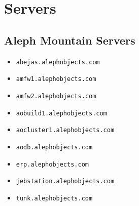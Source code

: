 %
%
%
%
%

\section{Servers}

\subsection{Aleph Mountain Servers}
\begin{itemize}
\item \texttt{abejas.alephobjects.com}
\item \texttt{amfw1.alephobjects.com}
\item \texttt{amfw2.alephobjects.com}
\item \texttt{aobuild1.alephobjects.com}
\item \texttt{aocluster1.alephobjects.com}
\item \texttt{aodb.alephobjects.com}
\item \texttt{erp.alephobjects.com}
\item \texttt{jebstation.alephobjects.com}
\item \texttt{tunk.alephobjects.com}
\end{itemize}

